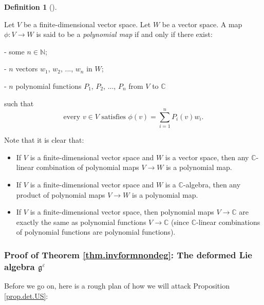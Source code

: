 \documentclass
[numbers=enddot,12pt,final,onecolumn,german,notitlepage]{scrartcl}%
\theoremstyle{definition}
\newtheorem{defi}[theo]{Definition}
\newenvironment{definition}[1][]
{\begin{defi}[#1]\begin{leftbar}}
{\end{leftbar}\end{defi}}
\begin{document}
\begin{definition}
\label{def.det.US.polymap}Let $V$ be a finite-dimensional vector space. Let
$W$ be a vector space. A map $\phi:V\rightarrow W$ is said to be a
\textit{polynomial map} if and only if there exist:

- some $n\in\mathbb{N}$;

- $n$ vectors $w_{1}$, $w_{2}$, $...$, $w_{n}$ in $W$;

- $n$ polynomial functions $P_{1}$, $P_{2}$, $...$, $P_{n}$ from $V$ to
$\mathbb{C}$

such that%
\[
\text{every }v\in V\text{ satisfies }\phi\left(  v\right)  =\sum
\limits_{i=1}^{n}P_{i}\left(  v\right)  w_{i}.
\]

\end{definition}

Note that it is clear that:

\begin{itemize}
\item If $V$ is a finite-dimensional vector space and $W$ is a vector space,
then any $\mathbb{C}$-linear combination of polynomial maps $V\rightarrow W$
is a polynomial map.

\item If $V$ is a finite-dimensional vector space and $W$ is a $\mathbb{C}%
$-algebra, then any product of polynomial maps $V\rightarrow W$ is a
polynomial map.

\item If $V$ is a finite-dimensional vector space, then polynomial maps
$V\rightarrow\mathbb{C}$ are exactly the same as polynomial functions
$V\rightarrow\mathbb{C}$ (since $\mathbb{C}$-linear combinations of polynomial
functions are polynomial functions).
\end{itemize}

\subsubsection{Proof of Theorem \ref{thm.invformnondeg}: The deformed Lie
algebra $\mathfrak{g}^{\varepsilon}$}

Before we go on, here is a rough plan of how we will attack Proposition
\ref{prop.det.US}:
\end{document}
